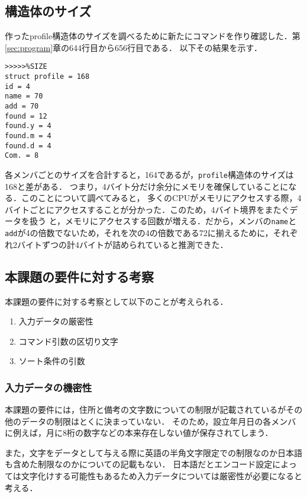 \documentclass[a4j,11pt]{jarticle}
\begin{document}
\subsection{構造体のサイズ}
作ったprofile構造体のサイズを調べるために新たにコマンドを作り確認した．第\ref{sec:program}章の644行目から656行目である．
以下その結果を示す．
\begin{verbatim}
>>>>>%SIZE
struct profile = 168
id = 4
name = 70
add = 70
found = 12
found.y = 4
found.m = 4
found.d = 4
Com. = 8
\end{verbatim}
各メンバごとのサイズを合計すると，164であるが，\verb|profile|構造体のサイズは168と差がある．
つまり，4バイト分だけ余分にメモリを確保していることになる．このことについて調べてみると，
多くのCPUがメモリにアクセスする際，4バイトごとにアクセスすることが分かった．このため，4バイト境界をまたぐデータを扱う
と，メモリにアクセスする回数が増える．だから，メンバの\verb|name|と\verb|add|が4の倍数でないため，それを次の4の倍数である72に揃えるために，それぞれ2バイトずつの計4バイトが詰められていると推測できた．
\subsection{本課題の要件に対する考察}
本課題の要件に対する考察として以下のことが考えられる．
\begin{enumerate}
\setlength{\parskip}{2pt} \setlength{\itemsep}{2pt}
 \item 入力データの厳密性
 \item コマンド引数の区切り文字
 \item ソート条件の引数
\end{enumerate}
\subsubsection{入力データの機密性}
本課題の要件には，住所と備考の文字数についての制限が記載されているがその他のデータの制限はとくに決まっていない．
そのため，設立年月日の各メンバに例えば，月に8桁の数字などの本来存在しない値が保存されてしまう．

また，文字をデータとして与える際に英語の半角文字限定での制限なのか日本語も含めた制限なのかについての記載もない．
日本語だとエンコード設定によっては文字化けする可能性もあるため入力データについては厳密性が必要になると考える．
\end{document}
